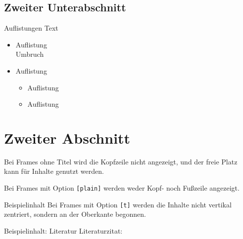 \subsection{Zweiter Unterabschnitt}
\begin{frame}{Auflistungen}
	Text
	\begin{itemize}
		\item Auflistung\\ Umbruch
		\item Auflistung
		\begin{itemize}
			\item Auflistung
			\item Auflistung
		\end{itemize}
	\end{itemize}
\end{frame}

\section{Zweiter Abschnitt}

\begin{frame}
        Bei Frames ohne Titel wird die Kopfzeile nicht angezeigt, und
    der freie Platz kann für Inhalte genutzt werden.
\end{frame}

\begin{frame}[plain]
    Bei Frames mit Option \texttt{[plain]} werden weder Kopf- noch Fußzeile angezeigt.
\end{frame}

\begin{frame}[t]{Beispielinhalt}
    Bei Frames mit Option \texttt{[t]} werden die Inhalte nicht vertikal zentriert, sondern an der Oberkante begonnen.
\end{frame}


\begin{frame}{Beispielinhalt: Literatur}
    Literaturzitat: \cite{klare2021jss}
\end{frame}


